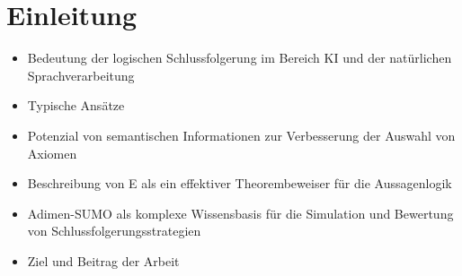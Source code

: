 \documentclass[german,version-2020-11]{uzl-thesis}
\begin{document}
%
%


\chapter{Einleitung}
  \begin{itemize}
    \item Bedeutung der logischen Schlussfolgerung im Bereich KI und der natürlichen Sprachverarbeitung
    \item Typische Ansätze
    \item Potenzial von semantischen Informationen zur Verbesserung der Auswahl von Axiomen
    \item Beschreibung von E als ein effektiver Theorembeweiser für die Aussagenlogik
    \item Adimen-SUMO als komplexe Wissensbasis für die Simulation und Bewertung von Schlussfolgerungsstrategien
    \item Ziel und Beitrag der Arbeit
  \end{itemize}
\end{document}
